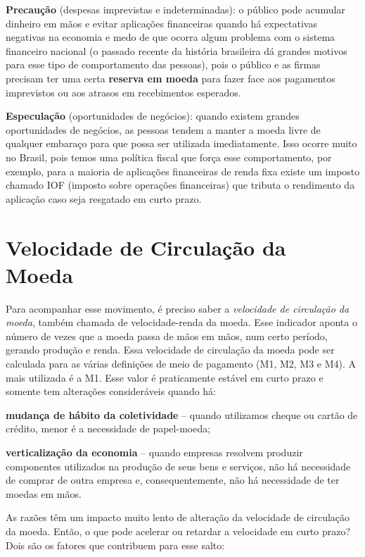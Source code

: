 \documentclass{article}\usepackage[]{graphicx}\usepackage[]{xcolor}
\begin{document}
\textbf{Precaução} (despesas imprevistas e indeterminadas): o público pode acumular dinheiro em mãos e 
evitar aplicações financeiras quando há expectativas negativas na economia e medo de que ocorra 
algum problema com o sistema financeiro nacional (o passado recente da história brasileira dá 
grandes motivos para esse tipo de comportamento das pessoas), pois o público e as firmas precisam 
ter uma certa \textbf{reserva em moeda} para fazer face aos pagamentos imprevistos ou aos atrasos em 
recebimentos esperados.\par

\textbf{Especulação} (oportunidades de negócios): quando existem grandes oportunidades de negócios, as 
pessoas tendem a manter a moeda livre de qualquer embaraço para que possa ser utilizada 
imediatamente. Isso ocorre muito no Brasil, pois temos uma política fiscal que força esse 
comportamento, por exemplo, para a maioria de aplicações financeiras de renda fixa existe um 
imposto chamado IOF (imposto sobre operações financeiras) que tributa o rendimento da aplicação 
caso seja resgatado em curto prazo.\par

\section*{Velocidade de Circulação da Moeda}

Para acompanhar esse movimento, é preciso saber a \textit{velocidade de circulação da moeda}, também 
chamada de velocidade-renda da moeda. Esse indicador aponta o número de vezes que a moeda passa 
de mãos em mãos, num certo período, gerando produção e renda. Essa velocidade  de circulação da 
moeda pode ser calculada para as várias definições de meio de pagamento (M1, M2, M3 e M4). A 
mais utilizada é a M1. Esse valor é praticamente estável em curto prazo e somente tem alterações 
consideráveis quando há:\par

\textbf{mudança de hábito da coletividade} -- quando utilizamos cheque ou cartão de crédito, 
menor é a necessidade de papel-moeda;\par

\textbf{verticalização da economia} -- quando empresas resolvem produzir componentes utilizados na 
produção de seus bens e serviços, não há necessidade de comprar de outra empresa e, consequentemente, 
não há necessidade de ter moedas em mãos.\par

As razões têm um impacto muito lento de alteração da velocidade de circulação da moeda. Então, o que 
pode acelerar ou retardar a velocidade em curto prazo? Dois são os fatores que contribuem para esse salto:\par
\end{document}
